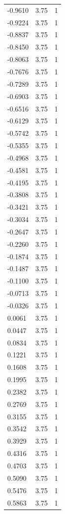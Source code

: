 \begin{longtable}{lrr}
  -0.9610 & 3.75 & 1 \\
  -0.9224 & 3.75 & 1 \\
  -0.8837 & 3.75 & 1 \\
  -0.8450 & 3.75 & 1 \\
  -0.8063 & 3.75 & 1 \\
  -0.7676 & 3.75 & 1 \\
  -0.7289 & 3.75 & 1 \\
  -0.6903 & 3.75 & 1 \\
  -0.6516 & 3.75 & 1 \\
  -0.6129 & 3.75 & 1 \\
  -0.5742 & 3.75 & 1 \\
  -0.5355 & 3.75 & 1 \\
  -0.4968 & 3.75 & 1 \\
  -0.4581 & 3.75 & 1 \\
  -0.4195 & 3.75 & 1 \\
  -0.3808 & 3.75 & 1 \\
  -0.3421 & 3.75 & 1 \\
  -0.3034 & 3.75 & 1 \\
  -0.2647 & 3.75 & 1 \\
  -0.2260 & 3.75 & 1 \\
  -0.1874 & 3.75 & 1 \\
  -0.1487 & 3.75 & 1 \\
  -0.1100 & 3.75 & 1 \\
  -0.0713 & 3.75 & 1 \\
  -0.0326 & 3.75 & 1 \\
  0.0061 & 3.75 & 1 \\
  0.0447 & 3.75 & 1 \\
  0.0834 & 3.75 & 1 \\
  0.1221 & 3.75 & 1 \\
  0.1608 & 3.75 & 1 \\
  0.1995 & 3.75 & 1 \\
  0.2382 & 3.75 & 1 \\
  0.2769 & 3.75 & 1 \\
  0.3155 & 3.75 & 1 \\
  0.3542 & 3.75 & 1 \\
  0.3929 & 3.75 & 1 \\
  0.4316 & 3.75 & 1 \\
  0.4703 & 3.75 & 1 \\
  0.5090 & 3.75 & 1 \\
  0.5476 & 3.75 & 1 \\
  0.5863 & 3.75 & 1 \\

\end{longtable}
